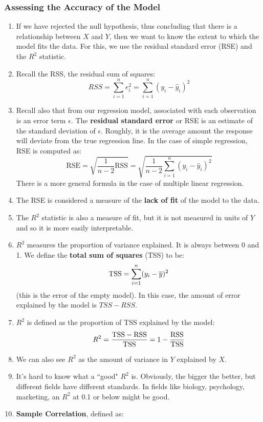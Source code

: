 \documentclass[10pt]{article}
\newcommand{\eps}{\epsilon}
\begin{document}
\subsubsection{Assessing the Accuracy of the Model} 
\begin{enumerate}
	\item If we have rejected the null hypothesis, thus concluding that there is a relationship between $X$ and $Y$, then we want to know the extent to which the model fits the data.  For this, we use the residual standard error (RSE) and the $R^2$ statistic.
	\item Recall the RSS, the residual sum of squares: 
	$$RSS = \sum_{i = 1}^n e_i^2 = \sum_{i = 1}^n (y_i - \hat y_i)^2$$
	\item Recall also that from our regression model, associated with each observation is an error term $\eps$. The \textbf{residual standard error} or RSE is an estimate of the standard deviation of $\eps$.  Roughly, it is the average amount the response will deviate from the true regression line.  In the case of simple regression, RSE is computed as:
	$$\text{RSE} = \sqrt{\dfrac{1}{n - 2} \text{RSS}} = \sqrt{\dfrac{1}{n - 2} \sum_{i = 1}^n (y_i - \hat y_i)^2}$$
	There is a more general formula in the case of multiple linear regression.
	\item The RSE is considered a measure of the \textbf{lack of fit} of the model to the data.
	\item The $R^2$ statistic is also a measure of fit, but it is not measured in units of $Y$ and so it is more easily interpretable.  
	\item $R^2$ measures the proportion of variance explained.  It is always between 0 and 1.  We  define the \textbf{total sum of squares} (TSS) to be:
	$${\rm{TSS}} = \sum_{i = 1}^n (y_i - \overline{y})^2 $$
	(this is the error of the empty model).  In this case, the amount of error explained by the model is $TSS - RSS$.
	\item $R^2$ is defined as the proportion of TSS explained by the model:
	$$R^2 = \dfrac{{\rm{TSS}} - {\rm{RSS}}}{{\rm{TSS}}} =  1 - \dfrac{{\rm{RSS}}}{\rm{TSS}}$$
	\item We can also see $R^2$ as the amount of variance in $Y$ explained by $X$.
	\item It's hard to know what a ``good" $R^2$ is.  Obviously, the bigger the better, but different fields have different standards.  In fields like biology, psychology, marketing, an $R^2$ at 0.1 or below might be good.
	\item \textbf{{\color{brown} Sample }Correlation}, defined as:

\end{enumerate}
\end{document}
